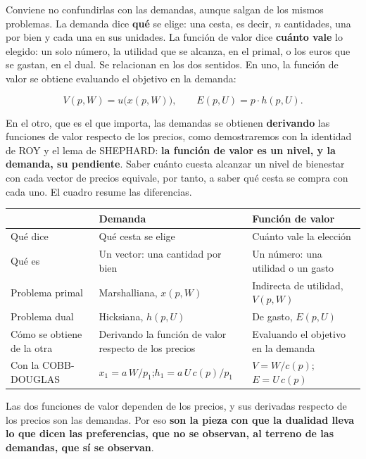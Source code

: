 \documentclass[10pt,a4paper]{article}
\begin{document}
Conviene no confundirlas con las demandas, aunque salgan de los mismos problemas. La demanda dice \textbf{qué} se elige: una cesta, es decir, $n$ cantidades, una por bien y cada una en sus unidades. La función de valor dice \textbf{cuánto vale} lo elegido: un solo número, la utilidad que se alcanza, en el primal, o los euros que se gastan, en el dual. Se relacionan en los dos sentidos. En uno, la función de valor se obtiene evaluando el objetivo en la demanda:

$$V(p,W)=u\big(x(p,W)\big),\qquad E(p,U)=p\cdot h(p,U).$$

En el otro, que es el que importa, las demandas se obtienen \textbf{derivando} las funciones de valor respecto de los precios, como demostraremos con la identidad de ROY y el lema de SHEPHARD: \textbf{la función de valor es un nivel, y la demanda, su pendiente}. Saber cuánto cuesta alcanzar un nivel de bienestar con cada vector de precios equivale, por tanto, a saber qué cesta se compra con cada uno. El cuadro resume las diferencias.

\begin{center}
\small
\renewcommand{\arraystretch}{1.4}
\begin{tabular}{|p{3.4cm}|p{5.3cm}|p{5.3cm}|}
    \hline
    \raggedright & \centering\textbf{Demanda} & \centering\textbf{Función de valor}\tabularnewline
    \hline
    \raggedright Qué dice & \raggedright Qué cesta se elige & \raggedright Cuánto vale la elección\tabularnewline
    \hline
    \raggedright Qué es & \raggedright Un vector: una cantidad por bien & \raggedright Un número: una utilidad o un gasto\tabularnewline
    \hline
    \raggedright Problema primal & \raggedright Marshalliana, $x(p,W)$ & \raggedright Indirecta de utilidad, $V(p,W)$\tabularnewline
    \hline
    \raggedright Problema dual & \raggedright Hicksiana, $h(p,U)$ & \raggedright De gasto, $E(p,U)$\tabularnewline
    \hline
    \raggedright Cómo se obtiene de la otra & \raggedright Derivando la función de valor respecto de los precios & \raggedright Evaluando el objetivo en la demanda\tabularnewline
    \hline
    \raggedright Con la COBB-DOUGLAS & \raggedright $x_1=a\,W/p_1$;\quad $h_1=a\,U\,c(p)/p_1$ & \raggedright $V=W/c(p)$;\quad $E=U\,c(p)$\tabularnewline
    \hline
\end{tabular}
\end{center}

Las dos funciones de valor dependen de los precios, y sus derivadas respecto de los precios son las demandas. Por eso \textbf{son la pieza con que la dualidad lleva lo que dicen las preferencias, que no se observan, al terreno de las demandas, que sí se observan}.
\end{document}
